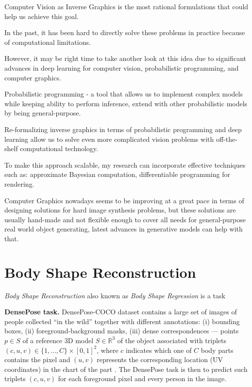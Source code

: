 Computer Vision as Inverse Graphics is the most rational formulations that could help us achieve this goal.

In the past, it has been hard to directly solve these problems in practice because of computational limitations.

However, it may be right time to take another look at this idea due to significant advances in deep learning for computer vision, probabilistic programming, and computer graphics.

Probabilistic programming - a tool that allows us to implement complex models while keeping ability to perform inference, extend with other probabilistic models by being general-purpose.

Re-formalizing inverse graphics in terms of probabilistic programming and deep learning allow us to solve even more complicated vision problems with off-the-shelf computational technology.

To make this approach scalable, my research can incorporate effective techniques such as: approximate Bayesian computation, differentiable programming for rendering.

Computer Graphics nowadays seems to be improving at a great pace in terms of designing solutions for hard image synthesis problems, but these solutions are usually hand-made and not flexible enough to cover all needs for general-purpose real world object generating, latest advances in generative models can help with that.

\section{Body Shape Reconstruction}

\textit{Body Shape Reconstruction} also known as \textit{Body Shape Regression} is a task 

\noindent 
\textbf{DensePose task.} DensePose-COCO dataset contains a large set of images of people collected ``in the wild'' together with different annotations: (i) bounding boxes, (ii) foreground-background masks, (iii) dense correspondences --- points $p \in S$ of a reference 3D model $S\in\mathbb{R}^3$ of the object associated with triplets $(c, u, v) \in\{1, \ldots, C\} \times[0,1]^{2}$, where $c$ indicates which one of $C$ body parts contains the pixel and $(u,v)$ represents the corresponding location (UV coordinates) in the chart of the part \cite{smpl}.
The DensePose task is then to predict such triplets $(c, u, v)$ for each foreground pixel and every person in the image.
\newline


